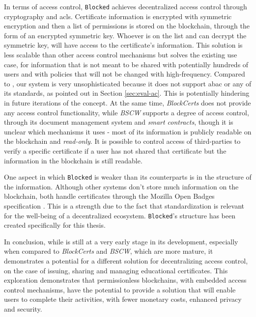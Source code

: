 In terms of access control, \texttt{Blocked} achieves decentralized access control through cryptography and \gls{acl}s. Certificate information is encrypted with symmetric encryption and then a list of permissions is stored on the blockchain, through the form of an encrypted symmetric key. Whoever is on the list and can decrypt the symmetric key, will have access to the certificate's information. This solution is less scalable than other access control mechanisms but solves the existing use case, for information that is not meant to be shared with potentially hundreds of users and with policies that will not be changed with high-frequency. Compared to \citeauthor{maesa_blockchain_2017} \cite{maesa_blockchain_2017}, our system is very unsophisticated because it does not support \gls{abac} or any of its standards, as pointed out in Section \ref{sec:eval-ac}. This is potentially hindering in future iterations of the concept. At the same time, \emph{BlockCerts} does not provide any access control functionality, while \emph{BSCW} supports a degree of access control, through its document management system and \emph{smart contracts}, though it is unclear which mechanisms it uses - most of its information is publicly readable on the blockchain and \emph{read-only}. It is possible to control access of third-parties to verify a specific certificate if a user has not shared that certificate but the information in the blockchain is still readable.

One aspect in which \texttt{Blocked} is weaker than its counterparts is in the structure of the information. Although other systems don't store much information on the blockchain, both handle certificates through the Mozilla Open Badges specification \cite{openbadges}. This is a strength due to the fact that standardization is relevant for the well-being of a decentralized ecosystem. \texttt{Blocked}'s structure has been created specifically for this thesis.

In conclusion, while  is still at a very early stage in its development, especially when compared to \emph{BlockCerts} and \emph{BSCW}, which are more mature, it demonstrates a potential for a different solution for decentralizing access control, on the case of issuing, sharing and managing educational certificates. This exploration demonstrates that permissionless blockchains, with embedded access control mechanisms, have the potential to provide a solution that will enable users to complete their activities, with fewer monetary costs, enhanced privacy and security. 

